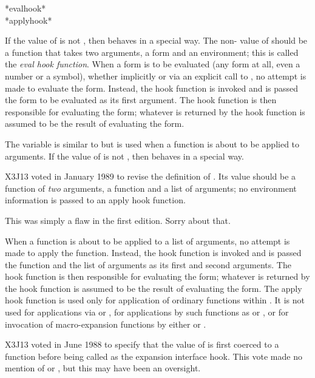 \begin{defun}[Variable]
*evalhook* \\
*applyhook*

If the value of  is not {\false}, then  behaves
in a special way.  The non-{\false} value of  should be a function
that takes two arguments, a form and an environment;
this is called the \emph{eval hook function}.
When a form is to be evaluated (any form at all, even a number or a symbol),
whether implicitly or via an explicit call to , no attempt
is made to evaluate the form.
Instead, the hook function is invoked and is passed the form to be evaluated
as its first argument.  The hook function is then responsible for
evaluating the form; whatever is returned by the hook function is assumed
to be the result of evaluating the form.

The variable  is similar to  but is used
when a function is about to be applied to arguments.
If the value of  is not {\false}, then  behaves
in a special way.

\begin{new}
X3J13 voted in January 1989
to revise the definition of .
Its value should be a function of \emph{two} arguments,
a function and a list of arguments; no environment information is passed
to an apply hook function.

This was simply a flaw in the first edition.  Sorry about that.
\end{new}

When a function is about to be applied to a list of arguments,
no attempt is made to apply the function.
Instead, the hook function is invoked and is passed the function and the list
of arguments
as its first and second arguments.  The hook function is then responsible for
evaluating the form; whatever is returned by the hook function is assumed
to be the result of evaluating the form.
The apply hook function is used only for application of ordinary functions
within .  It is not used for applications via  or
, for applications by such functions as  or
, or for invocation of macro-expansion functions
by either  or .

\begin{newer}
X3J13 voted in June 1988  to specify
that the value of  is first coerced to a
function before being called as the expansion interface hook.
This vote made no mention of  or ,
but this may have been an oversight.


\end{newer}
\end{defun}
